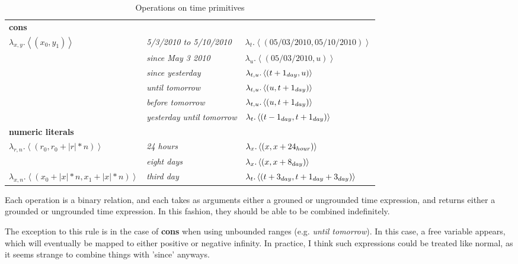 \documentclass{article}
\begin{document}
\begin{table}
\begin{center}
\begin{tabular}{l l l}
	\multicolumn{3}{l}{{\bf cons}} \\
	$\lambda_{x,y}.\left< (x_0, y_1) \right>$
		& {\em 5/3/2010 to 5/10/2010} 
			& $\lambda_{t}.\left< (05/03/2010,05/10/2010) \right>$ \\
		& {\em since May 3 2010} 
			& $\lambda_{u}.\left< (05/03/2010,u) \right>$ \\
		& {\em since yesterday} 
			& $\lambda_{t,u}.\left< (t+\day{1},u) \right>$ \\
		& {\em until tomorrow} 
			& $\lambda_{t,u}.\left< (u,t+\day{1}) \right>$ \\
		& {\em before tomorrow} 
			& $\lambda_{t,u}.\left< (u,t+\day{1}) \right>$ \\
		& {\em yesterday until tomorrow} 
			& $\lambda_{t}.\left< (t-\day{1},t+\day{1}) \right>$ \\
	
	\multicolumn{3}{l}{{\bf numeric literals}} \\
	$\lambda_{r,n}.\left< (r_0, r_0+|r|*n) \right>$
		& {\em 24 hours} 
			& $\lambda_x.\left< (x,x+\hour{24}) \right>$\\
		& {\em eight days} 
			& $\lambda_x.\left< (x,x+\day{8}) \right>$\\
	$\lambda_{x,n}.\left< (x_0+|x|*n, x_1+|x|*n) \right>$
		& {\em third day} 
			& $\lambda_t.\left< (t+\day{3},t+\day{1}+\day{3}) \right>$\\
		\hline
\end{tabular}
\end{center}
\caption{
\label{tab:ops}
Operations on time primitives
}
\end{table}

Each operation is a binary relation, and each takes as arguments either
	a grouned or ungrounded time expression, and returns either a grounded
	or ungrounded time expression.
In this fashion, they should be able to be combined indefinitely.

The exception to this rule is in the case of {\bf cons} when using unbounded
	ranges (e.g. {\em until tomorrow}).
In this case, a free variable appears, which will eventually be mapped to
	either positive or negative infinity.
In practice, I think such expressions could be treated like normal, as it
	seems strange to combine things with 'since' anyways.
\end{document}
